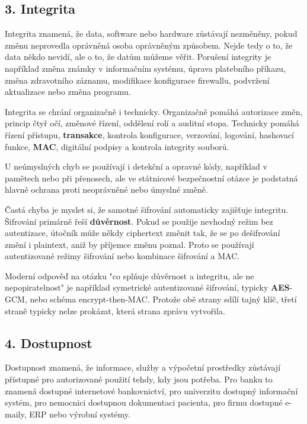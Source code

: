 \documentclass[11pt,a4paper]{article}
\begin{document}
\subsection*{3. Integrita}

Integrita znamená, že data, software nebo hardware zůstávají nezměněny, pokud změnu neprovedla oprávněná osoba oprávněným způsobem. Nejde tedy o to, že data někdo nevidí, ale o to, že datům můžeme věřit. Porušení integrity je například změna známky v informačním systému, úprava platebního příkazu, změna zdravotního záznamu, modifikace konfigurace firewallu, podvržení aktualizace nebo změna programu.

Integrita se chrání organizačně i technicky. Organizačně pomáhá autorizace změn, princip čtyř očí, změnové řízení, oddělení rolí a auditní stopa. Technicky pomáhá řízení přístupu, \textbf{transakce}, kontrola konfigurace, verzování, logování, hashovací funkce, \textbf{MAC}, digitální podpisy a kontrola integrity souborů.

U neúmyslných chyb se používají i detekční a opravné kódy, například v pamětech nebo při přenosech, ale ve státnicové bezpečnostní otázce je podstatná hlavně ochrana proti neoprávněné nebo úmyslné změně.

Častá chyba je myslet si, že samotné šifrování automaticky zajišťuje integritu. Šifrování primárně řeší \textbf{důvěrnost}. Pokud se použije nevhodný režim bez autentizace, útočník může někdy ciphertext změnit tak, že se po dešifrování změní i plaintext, aniž by příjemce změnu poznal. Proto se používají autentizované režimy šifrování nebo kombinace šifrování a MAC.

Moderní odpověď na otázku "co splňuje důvěrnost a integritu, ale ne nepopiratelnost" je například symetrické autentizované šifrování, typicky \textbf{AES}-GCM, nebo schéma encrypt-then-MAC. Protože obě strany sdílí tajný klíč, třetí straně typicky nelze prokázat, která strana zprávu vytvořila.

\subsection*{4. Dostupnost}

Dostupnost znamená, že informace, služby a výpočetní prostředky zůstávají přístupné pro autorizované použití tehdy, kdy jsou potřeba. Pro banku to znamená dostupné internetové bankovnictví, pro univerzitu dostupný informační systém, pro nemocnici dostupnou dokumentaci pacienta, pro firmu dostupné e- maily, ERP nebo výrobní systémy.
\end{document}
